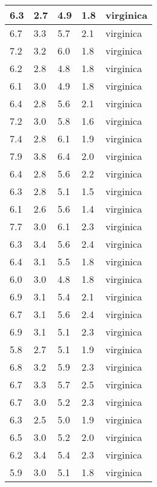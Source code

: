 \begin{table}
\begin{tabular}{|l|l|l|l|l|}
6.3 & 2.7 & 4.9 & 1.8 & virginica \\ \hline
6.7 & 3.3 & 5.7 & 2.1 & virginica \\ \hline
7.2 & 3.2 & 6.0 & 1.8 & virginica \\ \hline
6.2 & 2.8 & 4.8 & 1.8 & virginica \\ \hline
6.1 & 3.0 & 4.9 & 1.8 & virginica \\ \hline
6.4 & 2.8 & 5.6 & 2.1 & virginica \\ \hline
7.2 & 3.0 & 5.8 & 1.6 & virginica \\ \hline
7.4 & 2.8 & 6.1 & 1.9 & virginica \\ \hline
7.9 & 3.8 & 6.4 & 2.0 & virginica \\ \hline
6.4 & 2.8 & 5.6 & 2.2 & virginica \\ \hline
6.3 & 2.8 & 5.1 & 1.5 & virginica \\ \hline
6.1 & 2.6 & 5.6 & 1.4 & virginica \\ \hline
7.7 & 3.0 & 6.1 & 2.3 & virginica \\ \hline
6.3 & 3.4 & 5.6 & 2.4 & virginica \\ \hline
6.4 & 3.1 & 5.5 & 1.8 & virginica \\ \hline
6.0 & 3.0 & 4.8 & 1.8 & virginica \\ \hline
6.9 & 3.1 & 5.4 & 2.1 & virginica \\ \hline
6.7 & 3.1 & 5.6 & 2.4 & virginica \\ \hline
6.9 & 3.1 & 5.1 & 2.3 & virginica \\ \hline
5.8 & 2.7 & 5.1 & 1.9 & virginica \\ \hline
6.8 & 3.2 & 5.9 & 2.3 & virginica \\ \hline
6.7 & 3.3 & 5.7 & 2.5 & virginica \\ \hline
6.7 & 3.0 & 5.2 & 2.3 & virginica \\ \hline
6.3 & 2.5 & 5.0 & 1.9 & virginica \\ \hline
6.5 & 3.0 & 5.2 & 2.0 & virginica \\ \hline
6.2 & 3.4 & 5.4 & 2.3 & virginica \\ \hline
5.9 & 3.0 & 5.1 & 1.8 & virginica \\ \hline

\end{tabular}
\end{table}